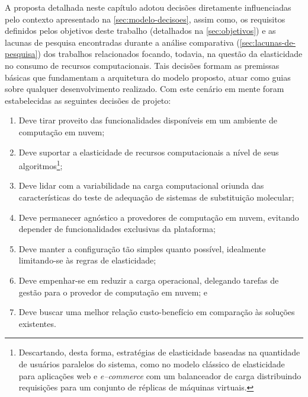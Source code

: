 \documentclass[english,brazilian]{UNISINOSmonografia} %
\begin{document}
A proposta detalhada neste capítulo adotou decisões diretamente influenciadas pelo contexto apresentado na \autoref{sec:modelo-decisoes}, assim como, os requisitos definidos pelos objetivos deste trabalho (detalhados na \autoref{sec:objetivos}) e as lacunas de pesquisa encontradas durante a análise comparativa (\autoref{sec:lacunas-de-pesquisa}) dos trabalhos relacionados focando, todavia, na questão da elasticidade no consumo de recursos computacionais.
Tais decisões formam as premissas básicas que fundamentam a arquitetura do modelo proposto, atuar como guias sobre qualquer desenvolvimento realizado.
Com este cenário em mente foram estabelecidas as seguintes decisões de projeto:
\begin{enumerate}[label=Decisão~\arabic*:,itemindent=*,leftmargin=*]
	\label{list:decisoes-de-projeto}
	
	\item Deve tirar proveito das funcionalidades disponíveis em um ambiente de computação em nuvem;

	\item Deve suportar a elasticidade de recursos computacionais a nível de seus algoritmos\footnote{
	Descartando, desta forma, estratégias de elasticidade baseadas na quantidade de usuários paralelos do sistema, como no modelo clássico de elasticidade para aplicações web e \textit{e--commerce} com um balanceador de carga distribuindo requisições para um conjunto de réplicas de máquinas virtuais.
};
	
	\item Deve lidar com a variabilidade na carga computacional oriunda das características do teste de adequação de sistemas de substituição molecular;
	
	\item Deve permanecer agnóstico a provedores de computação em nuvem, evitando depender de funcionalidades exclusivas da plataforma;
	
	\item Deve manter a configuração tão simples quanto possível, idealmente limitando-se às regras de elasticidade;

	\item Deve empenhar-se em reduzir a carga operacional, delegando tarefas de gestão para o provedor de computação em nuvem; e

	\item Deve buscar uma melhor relação custo-benefício em comparação às soluções existentes.
\end{enumerate}
\end{document}
